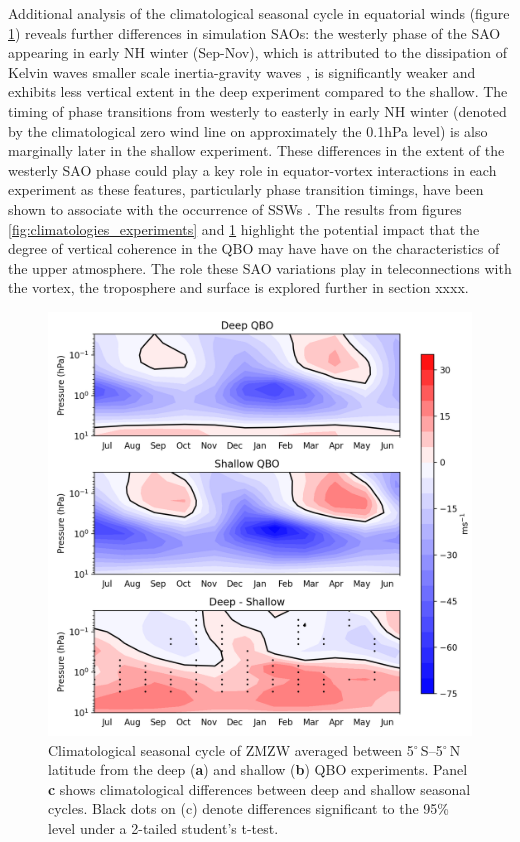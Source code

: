 Additional analysis of the climatological seasonal cycle in equatorial winds (figure \ref{fig:experiment_SAOs}) reveals further differences in simulation SAOs: the westerly phase of the SAO appearing in early NH winter (Sep-Nov), which is attributed to the dissipation of Kelvin waves smaller scale inertia-gravity waves \citep{Dunkerton1982, Hitchman1988}, is significantly weaker and exhibits less vertical extent in the deep experiment compared to the shallow. The timing of phase transitions from westerly to easterly in early NH winter (denoted by the climatological zero wind line on approximately the 0.1hPa level) is also marginally later in the shallow experiment. These differences in the extent of the westerly SAO phase could play a key role in equator-vortex interactions in each experiment as these features, particularly phase transition timings, have been shown to associate with the occurrence of SSWs \citep{JGray2001, Hamilton}. The results from figures \ref{fig:climatologies_experiments} and \ref{fig:experiment_SAOs} highlight the potential impact that the degree of vertical coherence in the QBO may have have on the characteristics of the upper atmosphere. The role these SAO variations play in teleconnections with the vortex, the troposphere and surface is explored further in section xxxx.

\begin{figure}[h!]
\begin{center}
\noindent\includegraphics[width = 0.7\linewidth]{Figures/Figures-deepQBO/SAO_seasonal_cycles.png}
\caption[Climatological seasonal cycle of equatorial ZMZW in QBO experiments]{Climatological seasonal cycle of ZMZW averaged between 5$^{\circ}$\,S--5$^{\circ}$\,N latitude from the deep (\textbf{a}) and shallow (\textbf{b}) QBO experiments. Panel \textbf{c} shows climatological differences between deep and shallow seasonal cycles. Black dots on (c) denote differences significant to the 95\% level under a 2-tailed student's t-test.}
\label{fig:experiment_SAOs}
\end{center}
\end{figure}



